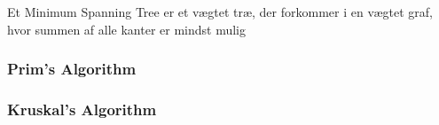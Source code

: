 Et Minimum Spanning Tree er et vægtet træ, der forkommer i en vægtet graf, hvor summen af alle kanter er mindst mulig

\subsubsection{Prim's Algorithm}


\subsubsection{Kruskal's Algorithm}

